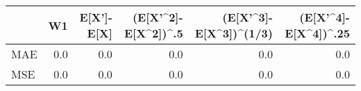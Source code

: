 \begin{tabular}{lrrrrr}
\toprule
{} &   W1 &  E[X']-E[X] &  (E[X'\textasciicircum 2]-E[X\textasciicircum 2])\textasciicircum .5 &  (E[X'\textasciicircum 3]-E[X\textasciicircum 3])\textasciicircum (1/3) &  (E[X'\textasciicircum 4]-E[X\textasciicircum 4])\textasciicircum .25 \\
\midrule
MAE &  0.0 &         0.0 &                  0.0 &                     0.0 &                   0.0 \\
MSE &  0.0 &         0.0 &                  0.0 &                     0.0 &                   0.0 \\
\bottomrule
\end{tabular}
